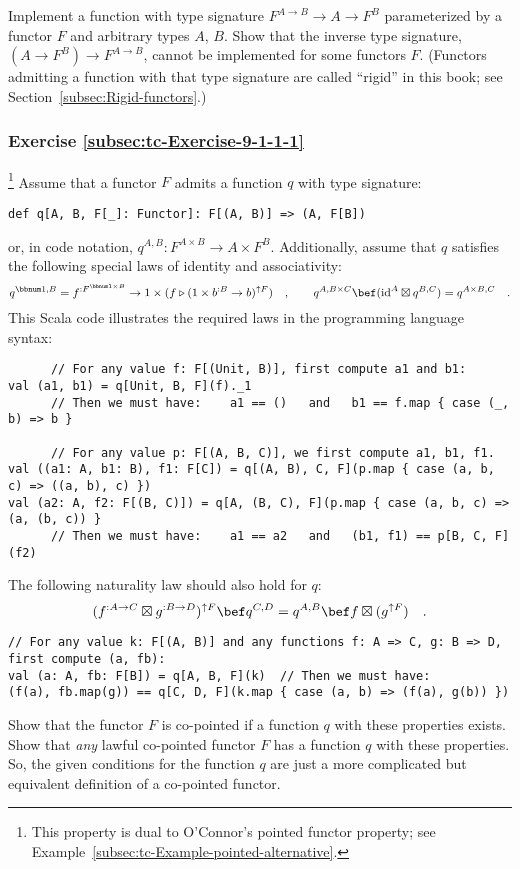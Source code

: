 Implement a function with type signature $F^{A\rightarrow B}\rightarrow A\rightarrow F^{B}$
parameterized by a functor $F$ and arbitrary types $A$, $B$. Show
that the inverse type signature, $(A\rightarrow F^{B})\rightarrow F^{A\rightarrow B}$,
cannot be implemented for some functors $F$. (Functors admitting
a function with that type signature are called \textsf{``}rigid\textsf{''}
in this book; see Section~\ref{subsec:Rigid-functors}.)

\subsubsection{Exercise \label{subsec:tc-Exercise-9-1-1-1}\ref{subsec:tc-Exercise-9-1-1-1}}

\footnote{This property is dual to O\textsf{'}Connor\textsf{'}s pointed functor property;
see Example~\ref{subsec:tc-Example-pointed-alternative}.} Assume that a functor $F$ admits a function $q$ with type signature:
\begin{lstlisting}
def q[A, B, F[_]: Functor]: F[(A, B)] => (A, F[B])
\end{lstlisting}
or, in code notation, $q^{A,B}:F^{A\times B}\rightarrow A\times F^{B}$.
Additionally, assume that $q$ satisfies the following special laws
of identity and associativity:
\[
q^{\bbnum 1,B}=f^{:F^{\bbnum 1\times B}}\rightarrow1\times(f\triangleright(1\times b^{:B}\rightarrow b)^{\uparrow F})\quad,\quad\quad q^{A,B\times C}\bef(\text{id}^{A}\boxtimes q^{B,C})=q^{A\times B,C}\quad.
\]
This Scala code illustrates the required laws in the programming language
syntax:
\begin{lstlisting}
      // For any value f: F[(Unit, B)], first compute a1 and b1:
val (a1, b1) = q[Unit, B, F](f)._1
      // Then we must have:    a1 == ()   and   b1 == f.map { case (_, b) => b }

      // For any value p: F[(A, B, C)], we first compute a1, b1, f1.
val ((a1: A, b1: B), f1: F[C]) = q[(A, B), C, F](p.map { case (a, b, c) => ((a, b), c) })
val (a2: A, f2: F[(B, C)]) = q[A, (B, C), F](p.map { case (a, b, c) => (a, (b, c)) }
      // Then we must have:    a1 == a2   and   (b1, f1) == p[B, C, F](f2)
\end{lstlisting}
The following naturality law should also hold for $q$:
\[
(f^{:A\rightarrow C}\boxtimes g^{:B\rightarrow D})^{\uparrow F}\bef q^{C,D}=q^{A,B}\bef f\boxtimes(g^{\uparrow F})\quad.
\]
\begin{lstlisting}
// For any value k: F[(A, B)] and any functions f: A => C, g: B => D, first compute (a, fb):
val (a: A, fb: F[B]) = q[A, B, F](k)  // Then we must have:
(f(a), fb.map(g)) == q[C, D, F](k.map { case (a, b) => (f(a), g(b)) })
\end{lstlisting}
Show that the functor $F$ is co-pointed if a function $q$ with these
properties exists. Show that \emph{any} lawful co-pointed functor
$F$ has a function $q$ with these properties. So, the given conditions
for the function $q$ are just a more complicated but equivalent definition
of a co-pointed functor.

